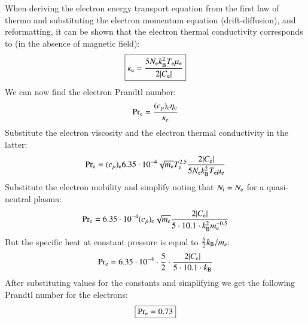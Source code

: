 \documentclass{warpdoc}
\newcommand\frameeqn[1]{\fbox{$\displaystyle #1$}}
\begin{document}
When deriving the electron energy transport equation from the first law of thermo and substituting the electron momentum equation (drift-diffusion), and reformatting, it can be shown that the electron thermal conductivity corresponds to (in the absence of magnetic field):
%
\begin{equation}
\frameeqn{
 \kappa_{\rm e}=\frac{5 N_{\rm e} k_{\rm B}^2 T_{\rm e} \mu_{\rm e}}{2|C_{\rm e}|}
}
\end{equation}
%
We can now find the electron Prandtl number:
%
\begin{equation}
 {\rm Pr_e} = \frac{(c_p)_{\rm e} \eta_{\rm e}}{\kappa_{\rm e}}
\end{equation}
%
Substitute the electron viscosity and the electron thermal conductivity in the latter:
%
\begin{equation}
 {\rm Pr_e} = (c_p)_{\rm e}  6.35 \cdot 10^{-4}  \sqrt{m_{\rm e}}   T_{\rm e}^{2.5} \frac{2|C_{\rm e}|}{5 N_{\rm e} k_{\rm B}^2 T_{\rm e} \mu_{\rm e}}
\end{equation}
%
Substitute the electron mobility and simplify noting that $N_{\rm i} = N_{\rm e}$ for a quasi-neutral plasma:
%
\begin{equation}
 {\rm Pr_e} = 6.35 \cdot 10^{-4} (c_p)_{\rm e}    \sqrt{m_{\rm e}}    \frac{2|C_{\rm e}|}{5\cdot 10.1\cdot  k_{\rm B}^2   m_{\rm e}^{-0.5}  }
\end{equation}
%
But the specific heat at constant pressure is equal to $\frac{5}{2}k_{\rm B}/m_e$:
%
\begin{equation}
 {\rm Pr_e} = 6.35 \cdot 10^{-4} \cdot \frac{5}{2}  \cdot      \frac{2|C_{\rm e}|}{5\cdot 10.1\cdot  k_{\rm B}    }
\end{equation}
%
After substituting values for the constants and simplifying we get the following Prandtl number for the electrons:
%
\begin{equation}
\frameeqn{
 {\rm Pr_e} = 0.73
}
\end{equation}
%









\appendix


  
  
\end{document}
